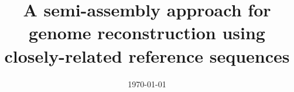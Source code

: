 \documentclass[a4paper, 11pt, oneside]{Thesis}  %
\begin{document}
\frontmatter      %

\title  {A semi-assembly approach for genome reconstruction using
closely-related reference sequences}
\date       {\today}
\subject    {}
\keywords   {}

\maketitle


\fancyhead{}  %
\rhead{\thepage}  %
\lhead{}  %

\pagestyle{fancy}  %







%






\end{document}
